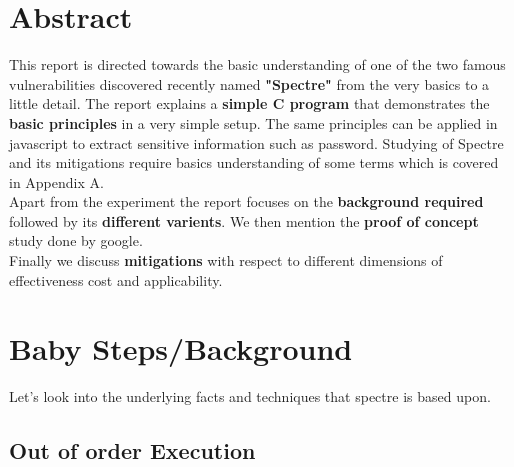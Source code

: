 \documentclass[12pt]{article}
\begin{document}

\tableofcontents
\pagebreak


\section{Abstract}
This report is directed towards the basic understanding of one of the two famous vulnerabilities discovered recently named \textbf{"Spectre"} from the very basics to a little detail. The report explains a \textbf{simple C program} that demonstrates the \textbf{basic principles} in a very simple setup. The same principles can be applied in javascript to extract sensitive information such as password. Studying of Spectre and its mitigations require basics understanding of some terms which is covered in Appendix A.\\

Apart from the experiment the report focuses on the \textbf{background required} followed by its \textbf{different varients}. We then mention the \textbf{proof of concept} study done by google. \\

Finally we discuss \textbf{mitigations} with respect to different dimensions of effectiveness cost and applicability.
%
%
\section{Baby Steps/Background}
Let's look into the underlying facts and techniques that spectre is based upon.
\subsection{Out of order Execution}
\end{document}
